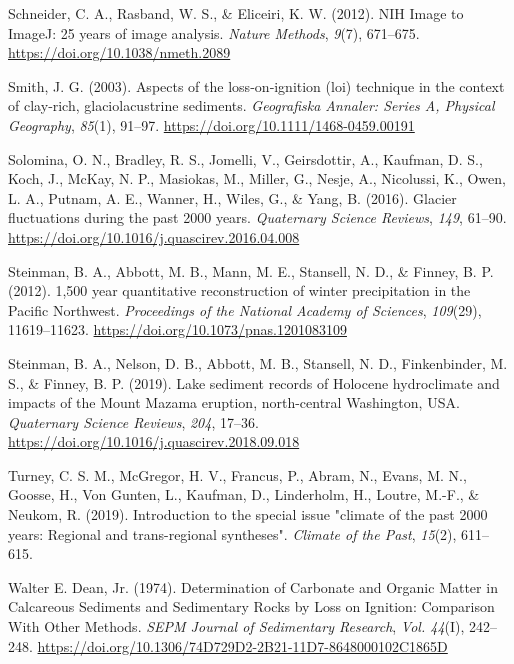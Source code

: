 \documentclass[
  letterpaper,
  DIV=11,
  numbers=noendperiod]{scrartcl}
\newlength{\cslhangindent}
\newlength{\cslentryspacingunit} %
\newenvironment{CSLReferences}[2] %
 {%
  \setlength{\parindent}{0pt}
  \ifodd #1
  \let\oldpar\par
  \def\par{\hangindent=\cslhangindent\oldpar}
  \fi
  \setlength{\parskip}{#2\cslentryspacingunit}
 }%
 {}
\begin{document}
\begin{CSLReferences}{1}{0}
\leavevmode{}%
Schneider, C. A., Rasband, W. S., \& Eliceiri, K. W. (2012). {NIH Image
to ImageJ: 25 years of image analysis}. \emph{Nature Methods},
\emph{9}(7), 671--675. \url{https://doi.org/10.1038/nmeth.2089}

\leavevmode{}%
Smith, J. G. (2003). {Aspects of the loss‐on‐ignition (loi) technique in
the context of clay‐rich, glaciolacustrine sediments}. \emph{Geografiska
Annaler: Series A, Physical Geography}, \emph{85}(1), 91--97.
\url{https://doi.org/10.1111/1468-0459.00191}

\leavevmode{}%
Solomina, O. N., Bradley, R. S., Jomelli, V., Geirsdottir, A., Kaufman,
D. S., Koch, J., McKay, N. P., Masiokas, M., Miller, G., Nesje, A.,
Nicolussi, K., Owen, L. A., Putnam, A. E., Wanner, H., Wiles, G., \&
Yang, B. (2016). {Glacier fluctuations during the past 2000 years}.
\emph{Quaternary Science Reviews}, \emph{149}, 61--90.
\url{https://doi.org/10.1016/j.quascirev.2016.04.008}

\leavevmode{}%
Steinman, B. A., Abbott, M. B., Mann, M. E., Stansell, N. D., \& Finney,
B. P. (2012). {1,500 year quantitative reconstruction of winter
precipitation in the Pacific Northwest}. \emph{Proceedings of the
National Academy of Sciences}, \emph{109}(29), 11619--11623.
\url{https://doi.org/10.1073/pnas.1201083109}

\leavevmode{}%
Steinman, B. A., Nelson, D. B., Abbott, M. B., Stansell, N. D.,
Finkenbinder, M. S., \& Finney, B. P. (2019). {Lake sediment records of
Holocene hydroclimate and impacts of the Mount Mazama eruption,
north-central Washington, USA}. \emph{Quaternary Science Reviews},
\emph{204}, 17--36.
\url{https://doi.org/10.1016/j.quascirev.2018.09.018}

\leavevmode{}%
Turney, C. S. M., McGregor, H. V., Francus, P., Abram, N., Evans, M. N.,
Goosse, H., Von Gunten, L., Kaufman, D., Linderholm, H., Loutre, M.-F.,
\& Neukom, R. (2019). {Introduction to the special issue "climate of the
past 2000 years: Regional and trans-regional syntheses"}. \emph{Climate
of the Past}, \emph{15}(2), 611--615.

\leavevmode{}%
Walter E. Dean, Jr. (1974). {Determination of Carbonate and Organic
Matter in Calcareous Sediments and Sedimentary Rocks by Loss on
Ignition: Comparison With Other Methods}. \emph{SEPM Journal of
Sedimentary Research}, \emph{Vol. 44}(I), 242--248.
\url{https://doi.org/10.1306/74D729D2-2B21-11D7-8648000102C1865D}


\end{CSLReferences}
\end{document}
